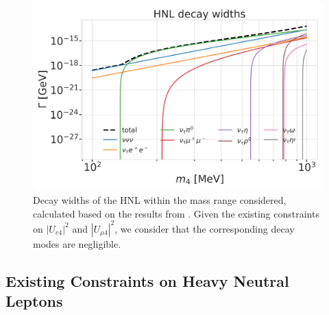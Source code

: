 

\begin{figure}
    \includegraphics{figures/hnl_simulation/decay_theory/hnl_decay_widths_up_to_1.0_GeV_log.png}
    \caption[HNL decay widths]{Decay widths of the HNL within the mass range considered, calculated based on the results from \cite{Coloma:2020lgy}. Given the existing constraints on $|U_{e4}|^{2}$ and $|U_{\mu4}|^{2}$, we consider that the corresponding decay modes are negligible.}
\end{figure}


\subsection{Existing Constraints on Heavy Neutral Leptons} 

